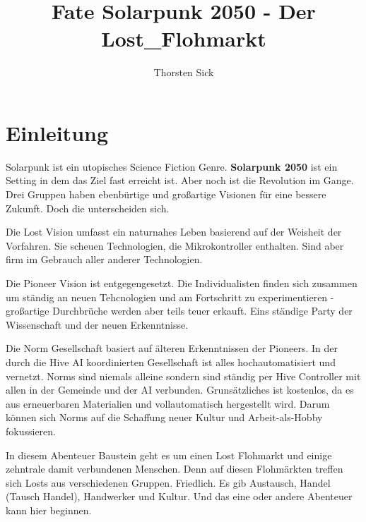 \documentclass{book}
\title{Fate Solarpunk 2050 - Der Lost_Flohmarkt}
\author{Thorsten Sick}
\begin{document}

\chapter{Einleitung}

Solarpunk ist ein utopisches Science Fiction Genre. \textbf{Solarpunk 2050} ist ein Setting in dem das Ziel fast erreicht ist. Aber noch ist die Revolution im Gange. Drei Gruppen haben ebenbürtige und großartige Visionen für eine bessere Zukunft. Doch die unterscheiden sich.

Die Lost Vision umfasst ein naturnahes Leben basierend auf der Weisheit der Vorfahren. Sie scheuen Technologien, die Mikrokontroller enthalten. Sind aber firm im Gebrauch aller anderer Technologien.

Die Pioneer Vision ist entgegengesetzt. Die Individualisten finden sich zusammen um ständig an neuen Tehcnologien und am Fortschritt zu experimentieren - großartige Durchbrüche werden aber teils teuer erkauft. Eins ständige Party der Wissenschaft und der neuen Erkenntnisse.

Die Norm Gesellschaft basiert auf älteren Erkenntnissen der Pioneers. In der durch die Hive AI koordinierten Gesellschaft ist alles hochautomatisiert und vernetzt. Norms sind niemals alleine sondern sind ständig per Hive Controller mit allen in der Gemeinde und der AI verbunden. Grunsätzliches ist kostenlos, da es aus erneuerbaren Materialien und vollautomatisch hergestellt wird. Darum können sich Norms auf die Schaffung neuer Kultur und Arbeit-als-Hobby fokussieren.

In diesem Abenteuer Baustein geht es um einen Lost Flohmarkt und einige zehntrale damit verbundenen Menschen. Denn auf diesen Flohmärkten treffen sich Losts aus verschiedenen Gruppen. Friedlich. Es gib Austausch, Handel (Tausch Handel), Handwerker und Kultur. Und das eine oder andere Abenteuer kann hier beginnen.








\end{document}
